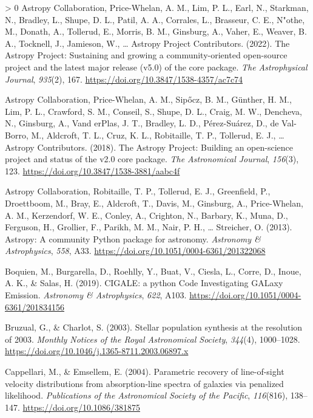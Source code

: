 \documentclass[10pt,a4paper,onecolumn]{article}
\newlength{\cslhangindent}
\newenvironment{CSLReferences}[3] %
 {%
  \setlength{\parindent}{0pt}
  \ifodd #1 \everypar{\setlength{\hangindent}{\cslhangindent}}\ignorespaces\fi
  \ifnum #2 > 0
  \setlength{\parskip}{#2\baselineskip}
  \fi
 }%
 {}
\begin{document}
\hypertarget{refs}{}
\begin{CSLReferences}{1}{0}
\leavevmode\hypertarget{ref-astropy:2022}{}%
Astropy Collaboration, Price-Whelan, A. M., Lim, P. L., Earl, N.,
Starkman, N., Bradley, L., Shupe, D. L., Patil, A. A., Corrales, L.,
Brasseur, C. E., N"othe, M., Donath, A., Tollerud, E., Morris, B. M.,
Ginsburg, A., Vaher, E., Weaver, B. A., Tocknell, J., Jamieson, W.,
\ldots{} Astropy Project Contributors. (2022). The {Astropy Project}:
Sustaining and growing a community-oriented open-source project and the
latest major release (v5.0) of the core package. \emph{The Astrophysical
Journal}, \emph{935}(2), 167.
\url{https://doi.org/10.3847/1538-4357/ac7c74}

\leavevmode\hypertarget{ref-astropy:2018}{}%
Astropy Collaboration, Price-Whelan, A. M., Sipőcz, B. M., Günther, H.
M., Lim, P. L., Crawford, S. M., Conseil, S., Shupe, D. L., Craig, M.
W., Dencheva, N., Ginsburg, A., Vand erPlas, J. T., Bradley, L. D.,
P\'erez-Su\'arez, D., de Val-Borro, M., Aldcroft, T. L., Cruz, K. L.,
Robitaille, T. P., Tollerud, E. J., \ldots{} Astropy Contributors.
(2018). The {Astropy Project}: Building an open-science project and
status of the v2.0 core package. \emph{The Astronomical Journal},
\emph{156}(3), 123. \url{https://doi.org/10.3847/1538-3881/aabc4f}

\leavevmode\hypertarget{ref-astropy:2013}{}%
Astropy Collaboration, Robitaille, T. P., Tollerud, E. J., Greenfield,
P., Droettboom, M., Bray, E., Aldcroft, T., Davis, M., Ginsburg, A.,
Price-Whelan, A. M., Kerzendorf, W. E., Conley, A., Crighton, N.,
Barbary, K., Muna, D., Ferguson, H., Grollier, F., Parikh, M. M., Nair,
P. H., \ldots{} Streicher, O. (2013). Astropy: A community {Python}
package for astronomy. \emph{Astronomy \& Astrophysics}, \emph{558},
A33. \url{https://doi.org/10.1051/0004-6361/201322068}

\leavevmode\hypertarget{ref-boquien+19}{}%
Boquien, M., Burgarella, D., Roehlly, Y., Buat, V., Ciesla, L., Corre,
D., Inoue, A. K., \& Salas, H. (2019). {CIGALE: a python Code
Investigating GALaxy Emission}. \emph{Astronomy \& Astrophysics},
\emph{622}, A103. \url{https://doi.org/10.1051/0004-6361/201834156}

\leavevmode\hypertarget{ref-bc+03}{}%
Bruzual, G., \& Charlot, S. (2003). {Stellar population synthesis at the
resolution of 2003}. \emph{Monthly Notices of the Royal Astronomical
Society}, \emph{344}(4), 1000--1028.
\url{https://doi.org/10.1046/j.1365-8711.2003.06897.x}

\leavevmode\hypertarget{ref-capellari+04}{}%
Cappellari, M., \& Emsellem, E. (2004). Parametric recovery of
line-of-sight velocity distributions from absorption-line spectra of
galaxies via penalized likelihood. \emph{Publications of the
Astronomical Society of the Pacific}, \emph{116}(816), 138--147.
\url{https://doi.org/10.1086/381875}


\end{CSLReferences}
\end{document}
